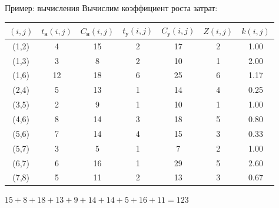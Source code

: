 \documentclass[unicode,11pt,notheorems]{beamer}
\begin{document}
\begin{frame}{Пример: вычисления}{}
Вычислим  коэффициент роста затрат:
\medskip
 	{\centering
	\begin{tabular}{|c|c|c|c|c||c|c|}
		\hline
		$(i,j)$ & $t_\text{н}(i,j)$ & $C_\text{н}(i,j)$ & $t_\text{у}(i,j)$ & $C_\text{у}(i,j)$  & $Z(i,j)$ & $k(i,j)$ \\
		\hline
		(1,2) & 4  & 15 & 2 & 17 & 2 & 1.00 \\ %
		(1,3) & 3  & 8  & 2 & 10 & 1 & 2.00 \\ %
		(1,6) & 12 & 18 & 6 & 25 & 6 & 1.17 \\ %
		(2,4) & 5  & 13 & 1 & 14 & 4 & 0.25 \\ %
		(3,5) & 2  & 9  & 1 & 10 & 1 & 1.00 \\ %
		(4,6) & 8  & 14 & 3 & 18 & 5 & 0.80 \\ %
		(5,6) & 7  & 14 & 4 & 15 & 3 & 0.33 \\ %
		(5,7) & 3  & 5  & 1 & 7  & 2 & 1.00 \\ %
		(6,7) & 6  & 16 & 1 & 29 & 5 & 2.60 \\ %
		(7,8) & 5  & 11 & 2 & 13 & 3 & 0.67 \\ %
	\hline			
	\end{tabular}\par} 	
 $15+8+18+13+9+14+14+5+16+11=123$	

\end{frame}
\end{document}
